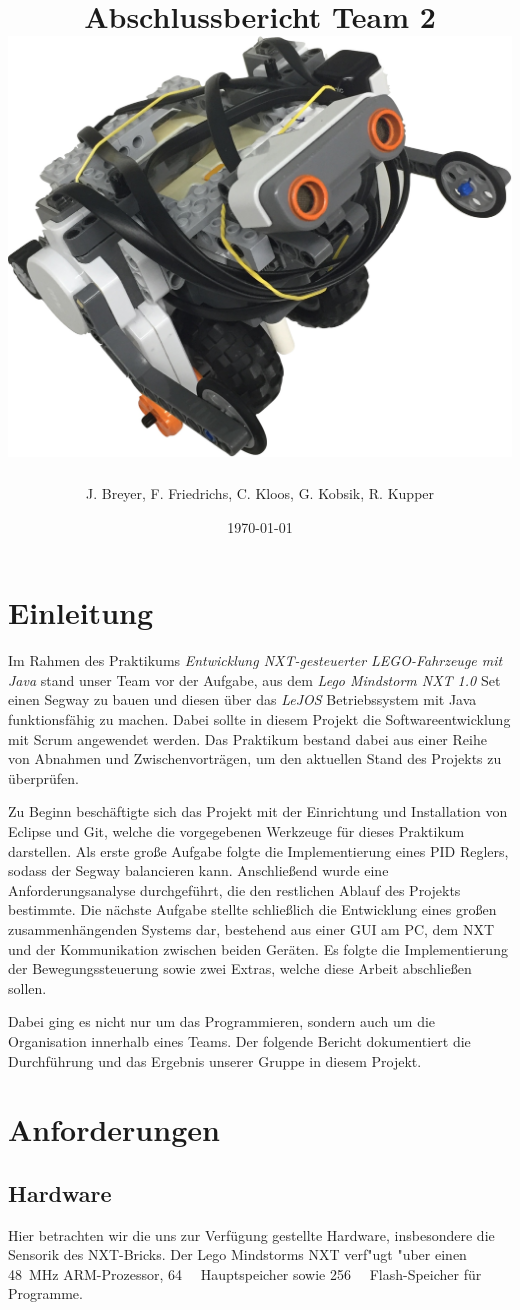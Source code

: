 \documentclass[oneside,abstractoff,a4paper]{scrartcl}
\title{Abschlussbericht Team 2
\includegraphics[angle=330,width=\textwidth,height=0.4\textheight,keepaspectratio]{NXT_3.jpg}}
\author{J. Breyer, F. Friedrichs, C. Kloos, G. Kobsik, R. Kupper}
\date{\today}
\begin{document}
\pagestyle{useheadings}
\maketitle
\newpage
\tableofcontents
\cleardoublepage
\pagestyle{scrheadings}


\section{Einleitung}

Im Rahmen des Praktikums \textit{Entwicklung NXT-gesteuerter LEGO-Fahrzeuge mit Java} stand unser Team vor der Aufgabe, aus dem \textit{Lego Mindstorm NXT 1.0} Set einen Segway zu bauen und diesen über das \textit{LeJOS} Betriebssystem mit Java funktionsfähig zu machen. Dabei sollte in diesem Projekt die Softwareentwicklung mit Scrum angewendet werden.
Das Praktikum bestand dabei aus einer Reihe von Abnahmen und Zwischenvorträgen, um den aktuellen Stand des Projekts zu überprüfen. 

Zu Beginn beschäftigte sich das Projekt mit der Einrichtung und Installation von Eclipse und Git, welche die vorgegebenen Werkzeuge für dieses Praktikum darstellen. Als erste große Aufgabe folgte die Implementierung eines PID Reglers, sodass der Segway balancieren kann. Anschließend wurde eine Anforderungsanalyse durchgeführt, die den restlichen Ablauf des Projekts bestimmte. Die nächste Aufgabe stellte schließlich die Entwicklung eines großen zusammenhängenden Systems dar, bestehend aus einer GUI am PC, dem NXT und der Kommunikation zwischen beiden Geräten. Es folgte die Implementierung der Bewegungssteuerung sowie zwei Extras, welche diese Arbeit abschließen sollen. 

Dabei ging es nicht nur um das Programmieren, sondern auch um die Organisation innerhalb eines Teams. Der folgende Bericht dokumentiert die Durchführung und das Ergebnis unserer Gruppe in diesem Projekt.

\section{Anforderungen}

\subsection{Hardware}
\label{subsec:hardware}
Hier betrachten wir die uns zur Verfügung gestellte Hardware, insbesondere die Sensorik des NXT-Bricks.
Der Lego Mindstorms NXT verf"ugt "uber einen \SI{48}{\mega\hertz} ARM-Prozessor, \SI{64}{\kibi\byte} Hauptspeicher sowie \SI{256}{\kibi\byte} Flash-Speicher für Programme.
\end{document}
